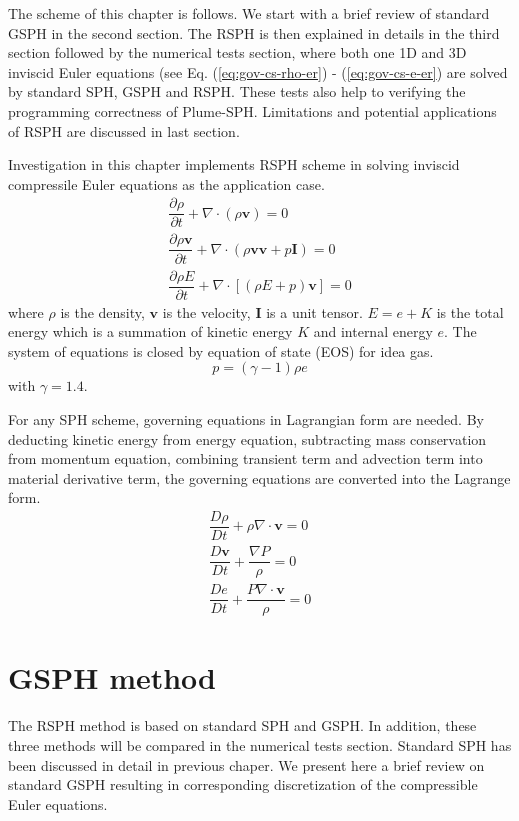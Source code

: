The scheme of this chapter is follows. We start with a brief review of standard GSPH in the second section. The RSPH is then explained in details in the third section followed by the numerical tests section, where both one 1D and 3D inviscid Euler equations (see Eq. (\ref{eq:gov-cs-rho-er}) - (\ref{eq:gov-cs-e-er}) are solved by standard SPH, GSPH and RSPH. These tests also help to verifying the programming correctness of Plume-SPH. Limitations and potential applications of RSPH are discussed in last section. 

Investigation in this chapter implements RSPH scheme in solving inviscid compressile Euler equations as the application case.  
\begin{align}
\dfrac{\partial \rho}{\partial t} + \nabla \cdot \left(\rho \textbf{v} \right) = 0 \label{eq:gov-cs-rho-er} \\
\dfrac{\partial \rho \textbf{v}}{\partial t} + \nabla \cdot \left(\rho \textbf{v} \textbf{v} + p\textbf{I}\right) = 0 \label{eq:gov-cs-v-er} \\
\dfrac{\partial \rho E}{\partial t} + \nabla \cdot \left[\left(\rho E + p \right)\textbf{v}\right] = 0 \label{eq:gov-cs-e-er}
\end{align}
where $\rho$ is the density, $\textbf{v}$ is the velocity, $\textbf{I}$ is a unit tensor.
$E = e + K $ is the total energy which is a summation of kinetic energy $K$ and internal energy $e$.
The system of equations is closed by equation of state (EOS) for idea gas.
\begin{equation}
p = \left(\gamma - 1\right)\rho e \label{eq:EOS-er}
\end{equation}
with $\gamma=1.4$.

For any SPH scheme, governing equations in Lagrangian form are needed. By deducting kinetic energy from energy equation, subtracting mass conservation from momentum equation, combining transient term and advection term into material derivative term, the governing equations are converted into the Lagrange form. 
\begin{align}
\dfrac{D \rho}{D t} + \rho \nabla \cdot \textbf{v} = 0 \label{eq:gov-nc-rho-er}\\
\dfrac{D \textbf{v}}{D t} + \dfrac{\nabla P}{\rho} =0 \label{eq:gov-nc-v-er}\\
\dfrac{D e}{D t} + \dfrac{P \nabla \cdot \textbf{v}}{\rho} = 0 \label{eq:gov-nc-e-er}
\end{align}

\section{GSPH method} \label{sec:GSPH-method}
The RSPH method is based on standard SPH and GSPH. In addition, these three methods will be compared in the numerical tests section. Standard SPH has been discussed in detail in previous chaper. We present here a brief review on standard GSPH resulting in corresponding discretization of the compressible Euler equations.
 
